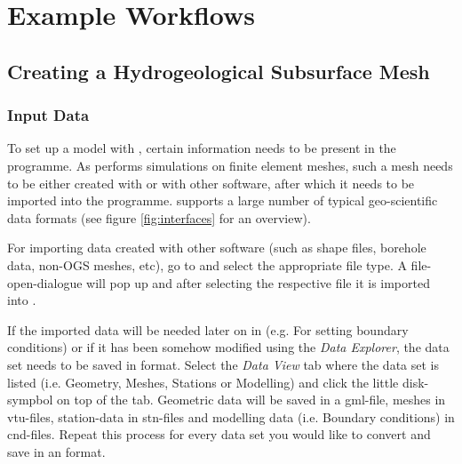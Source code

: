 \chapter{Example Workflows}

\section{Creating a Hydrogeological Subsurface Mesh}

\subsection{Input Data}

To set up a model with \ogs, certain information needs to be present in the programme. As \ogs performs simulations on finite element meshes, such a mesh needs to be either created with \ogs or with other software, after which it needs to be imported into the programme. \ogs supports a large number of typical geo-scientific data formats (see figure \ref{fig:interfaces} for an overview).

For importing data created with other software (such as shape files, borehole data, non-OGS meshes, etc), go to  and select the appropriate file type. A file-open-dialogue will pop up and after selecting the respective file it is imported into \ogs.

If the imported data will be needed later on in \ogs (e.g. For setting boundary conditions) or if it has been somehow modified using the \emph{Data Explorer}, the data set needs to be saved in \ogs format. Select the \emph{Data View} tab where the data set is listed (i.e. Geometry, Meshes, Stations or Modelling) and click the little disk-sympbol on top of the tab. Geometric data will be saved in a gml-file, meshes in vtu-files, station-data in stn-files and modelling data (i.e. Boundary conditions) in cnd-files. Repeat this process for every data set you would like to convert and save in an \ogs format.

